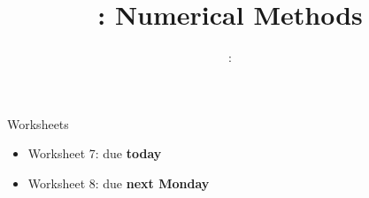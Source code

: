 \usepackage{../../beamerthemeFalmouthGamesAcademy}
\usepackage{multimedia}
\graphicspath{ {../../} }

\lstset{language=[Sharp]C}

\usepackage[normalem]{ulem}
\usepackage{wasysym}

\usepackage{pdfpages}


\usepackage{algpseudocode}
\usepackage{qtree}




\title{\sessionnumber: Numerical Methods}
\subtitle{\modulecode: \moduletitle}

\frame{\titlepage} 

\begin{frame}{Worksheets}
	\begin{itemize}
		\item Worksheet 7: due \textbf{today}
		\item Worksheet 8: due \textbf{next Monday}
	\end{itemize}
\end{frame}




%


